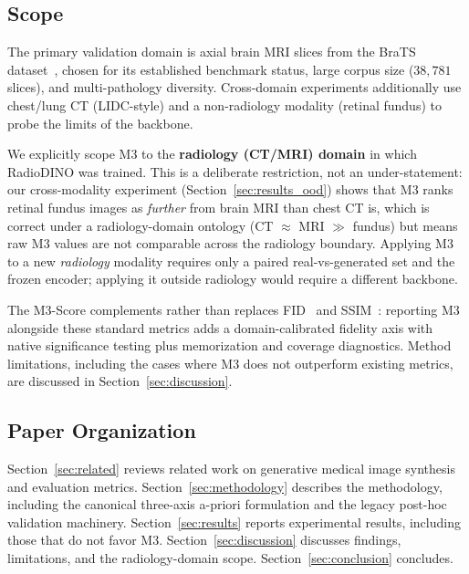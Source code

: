 \documentclass[lettersize,journal]{IEEEtran}
\begin{document}
\subsection{Scope}
\label{sec:scope}

The primary validation domain is axial brain MRI slices from the BraTS
dataset~\cite{menze2014multimodal,bakas2018identifying}, chosen for its
established benchmark status, large corpus size ($38{,}781$ slices), and
multi-pathology diversity. Cross-domain experiments additionally use
chest/lung CT (LIDC-style) and a non-radiology modality (retinal fundus)
to probe the limits of the backbone.

We explicitly scope M3 to the \textbf{radiology (CT/MRI) domain} in which
RadioDINO was trained. This is a deliberate restriction, not an
under-statement: our cross-modality experiment (Section~\ref{sec:results_ood})
shows that M3 ranks retinal fundus images as \emph{further} from brain MRI
than chest CT is, which is correct under a radiology-domain ontology
(CT $\approx$ MRI $\gg$ fundus) but means raw M3 values are not comparable
across the radiology boundary. Applying M3 to a new \emph{radiology}
modality requires only a paired real-vs-generated set and the frozen
encoder; applying it outside radiology would require a different backbone.

The M3-Score complements rather than replaces
FID~\cite{heusel2017gans} and SSIM~\cite{wang2004image}: reporting M3
alongside these standard metrics adds a domain-calibrated fidelity axis
with native significance testing plus memorization and coverage diagnostics.
Method limitations, including the cases where M3 does not outperform
existing metrics, are discussed in Section~\ref{sec:discussion}.

\subsection{Paper Organization}
\label{sec:organization}

Section~\ref{sec:related} reviews related work on generative medical image
synthesis and evaluation metrics. Section~\ref{sec:methodology} describes the
methodology, including the canonical three-axis a-priori formulation and the
legacy post-hoc validation machinery. Section~\ref{sec:results} reports
experimental results, including those that do not favor M3.
Section~\ref{sec:discussion} discusses findings, limitations, and the
radiology-domain scope. Section~\ref{sec:conclusion} concludes.
\end{document}
